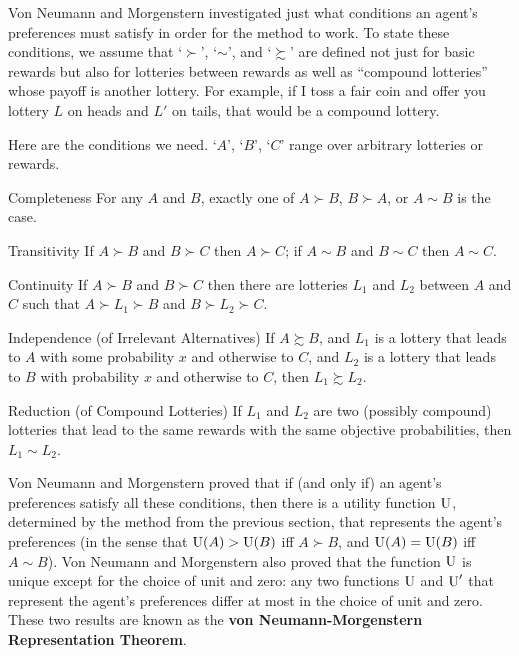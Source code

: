 Von Neumann and Morgenstern investigated just what conditions an agent's
preferences must satisfy in order for the method to work. To state these
conditions, we assume that `$\succ$', `$\sim$', and `$\succsim$' are defined not
just for basic rewards but also for lotteries between rewards as well as
``compound lotteries'' whose payoff is another lottery. For example, if I toss a
fair coin and offer you lottery $L$ on heads and $L'$ on tails, that would be a
compound lottery.

Here are the conditions we need. `$A$', `$B$', `$C$' range over arbitrary
lotteries or rewards.

\begin{genericthm}{Completeness}
  For any $A$ and $B$, exactly one of $A \succ B$, $B\succ A$, or $A
  \sim B$ is the case.
\end{genericthm}
\vspace{-5mm}
\begin{genericthm}{Transitivity}
  If $A \succ B$ and $B \succ C$ then $A \succ C$; if $A \sim B$ and $B \sim C$
  then $A \sim C$.
\end{genericthm}
\vspace{-5mm}
\begin{genericthm}{Continuity}
  If $A \succ B$ and $B \succ C$ then there are lotteries $L_1$ and $L_2$
  between $A$ and $C$ such that $A \succ L_1 \succ B$ and $B \succ L_2 \succ C$.
\end{genericthm}
\vspace{-5mm}
\begin{genericthm}{Independence (of Irrelevant Alternatives)}
  If $A \succsim B$, and $L_1$ is a lottery that leads to $A$ with some probability
  $x$ and otherwise to $C$, and $L_2$ is a lottery that leads to $B$ with
  probability $x$ and otherwise to $C$, then $L_1 \succsim L_2$.
\end{genericthm}
\vspace{-5mm}
\begin{genericthm}{Reduction (of Compound Lotteries)}
  If $L_1$ and $L_2$ are two (possibly compound) lotteries that lead
  to the same rewards with the same objective probabilities, then $L_1
  \sim L_2$.
\end{genericthm}

Von Neumann and Morgenstern proved that if (and only if) an agent's preferences
satisfy all these conditions, then there is a utility function $\text{U}$, determined
by the method from the previous section, that represents the agent's preferences
(in the sense that $\text{U}(A) > \text{U}(B)$ iff $A \succ B$, and $\text{U}(A)=\text{U}(B)$ iff
$A \sim B$). Von Neumann and Morgenstern also proved that the function $\text{U}$ is
unique except for the choice of unit and zero: any two functions $\text{U}$ and $\text{U}'$
that represent the agent's preferences differ at most in the choice of unit and
zero. These two results are known as the \textbf{von Neumann-Morgenstern
  Representation Theorem}.

